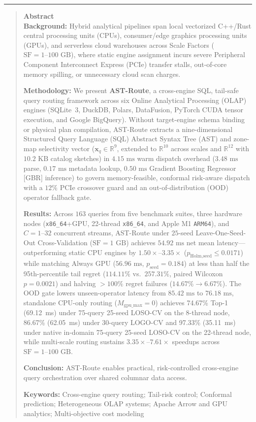 \documentclass[10pt,a4paper]{article}
\begin{document}
\noindent\rule{\textwidth}{0.8pt}
\begin{quote}
\small\sffamily
\textbf{\color{springerblue}Abstract}\\[0.3em]
\textbf{Background:} Hybrid analytical pipelines span local vectorized C++/Rust central processing units (CPUs), consumer/edge graphics processing units (GPUs), and serverless cloud warehouses across Scale Factors ($\text{SF}=1\text{--}100\text{ GB}$), where static engine assignment incurs severe Peripheral Component Interconnect Express (PCIe) transfer stalls, out-of-core memory spilling, or unnecessary cloud scan charges.

\textbf{Methodology:} We present \textbf{AST-Route}, a cross-engine SQL, tail-safe query routing framework across six Online Analytical Processing (OLAP) engines (SQLite~3, DuckDB, Polars, DataFusion, PyTorch CUDA tensor execution, and Google BigQuery). Without target-engine schema binding or physical plan compilation, AST-Route extracts a nine-dimensional Structured Query Language (SQL) Abstract Syntax Tree (AST) and zone-map selectivity vector ($\mathbf{x}_q \in \mathbb{R}^{9}$, extended to $\mathbb{R}^{10}$ across scales and $\mathbb{R}^{12}$ with $10.2\text{ KB}$ catalog sketches) in $4.15\text{ ms}$ warm dispatch overhead ($3.48\text{ ms}$ parse, $0.17\text{ ms}$ metadata lookup, $0.50\text{ ms}$ Gradient Boosting Regressor [GBR] inference) to govern memory-feasible, conformal risk-aware dispatch with a $12\%$ PCIe crossover guard and an out-of-distribution (OOD) operator fallback gate.

\textbf{Results:} Across $163$ queries from five benchmark suites, three hardware nodes (\texttt{x86\_\allowbreak{}64}+GPU, 22-thread \texttt{x86\_\allowbreak{}64}, and Apple M1 \texttt{ARM64}), and $C=1\text{--}32$ concurrent streams, AST-Route under $25$-seed Leave-One-Seed-Out Cross-Validation ($\text{SF}=1\text{ GB}$) achieves $54.92\text{ ms}$ net mean latency---outperforming static CPU engines by $1.50\times\text{--}3.35\times$ ($p_{\text{Holm,seed}}\le 0.0171$) while matching Always GPU ($56.96\text{ ms}$, $p_{\text{seed}}=0.184$) at less than half the 95th-percentile tail regret ($114.11\%$ vs.\ $257.31\%$, paired Wilcoxon $p = 0.0021$) and halving $>100\%$ regret failures ($14.67\%\rightarrow 6.67\%$). The OOD gate lowers unseen-operator latency from $85.42\text{ ms}$ to $76.18\text{ ms}$, standalone CPU-only routing ($M_{\text{gpu\_max}}=0$) achieves 74.67\% Top-1 (69.12~ms) under 75-query 25-seed LOSO-CV on the 8-thread node, 86.67\% (62.05~ms) under 30-query LOGO-CV and 97.33\% (35.11~ms) under native in-domain 75-query 25-seed LOSO-CV on the 22-thread node, while multi-scale routing sustains $3.35\times\text{--}7.61\times$ speedups across $\text{SF}=1\text{--}100\text{ GB}$.

\textbf{Conclusion:} AST-Route enables practical, risk-controlled cross-engine query orchestration over shared columnar data access.

\noindent\textbf{Keywords:} Cross-engine query routing; Tail-risk control; Conformal prediction; Heterogeneous OLAP systems; Apache Arrow and GPU analytics; Multi-objective cost modeling
\end{quote}
\end{document}
